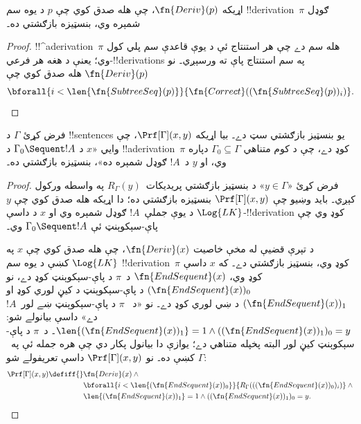 \documentclass[../../../include/open-logic-section]{subfiles}
\begin{document}
\begin{prop}
  اړيکه $\fn{Deriv}(p)$، چې هله صدق کوي چې $p$ د يوه سم
  !!{derivation}~$\pi$ ګوډل شمېره وي، بنسټيزه بازګشتي ده۔
\end{prop}

\begin{proof}
  !!^a{derivation}~$\pi$ هله سم دے چې هر استنتاج ئې د يوې قاعدې سم
  پلي کول وي؛ يعنې د هغه هر فرعي-!!{derivation}s په سم استنتاج پاې ته
  ورسېږي۔ نو $\fn{Deriv}(p)$ هله صدق کوي چې
  \[
  \bforall{i<\len{\fn{SubtreeSeq}(p)}}{\fn{Correct}((\fn{SubtreeSeq}(p))_i)}.
  \]
\end{proof}

\begin{prop}
فرض کړئ $\Gamma$ د !!{sentence}s يو بنسټيز بازګشتي سټ دے۔ بيا
اړيکه $\Prf[\Gamma](x,y)$، چې وايي «$x$ د
$\Gamma_0 \Sequent !A$ د !!a{derivation}~$\pi$ کوډ دے، چې د کوم
متناهي $\Gamma_0\subseteq\Gamma$ دپاره وي، او $y$ د~$!A$ ګوډل
شمېره ده»، بنسټيزه بازګشتي ده۔
\end{prop}

\begin{proof}
فرض کړئ «$y\in\Gamma$» د بنسټيز بازګشتي
پريديکات~$R_\Gamma(y)$ په واسطه ورکول کېږي۔ بايد وښيو چې
$\Prf[\Gamma](x,y)$ بنسټيزه بازګشتي ده؛ دا اړيکه هله صدق کوي چې
$y$ د يوې جملې~$!A$ ګوډل شمېره وي او $x$ د داسې
$\Log{LK}$-!!{derivation} کوډ وي چې پاې-سېکوېنټ ئې
$\Gamma_0\Sequent !A$ وي۔

د تېرې قضيې له مخې خاصيت $\fn{Deriv}(x)$، چې هله صدق کوي چې $x$ په
$\Log{LK}$ کښې د يوه سم !!{derivation}~$\pi$ کوډ وي، بنسټيز بازګشتي
دے۔ که $x$ داسې کوډ وي، $\fn{EndSequent}(x)$ د~$\pi$ د
پاې-سېکوېنټ کوډ دے، نو $(\fn{EndSequent}(x))_0$ د پاې-سېکوېنټ د
کيڼ لوري کوډ او $(\fn{EndSequent}(x))_1$ د ښي لوري کوډ دے۔ نو «د
~$\pi$ د پاې-سېکوېنټ ښے لور~$!A$ دے» داسې بيانولے شو:
$\len{(\fn{EndSequent}(x))_1}=1\land
((\fn{EndSequent}(x))_1)_0=y$۔
د~$\pi$ د پاې-سېکوېنټ کيڼ لور البته پخپله متناهي دے؛ يوازې دا بيانول
پکار دي چې هره جمله ئې په~$\Gamma$ کښې ده۔ نو
$\Prf[\Gamma](x,y)$ داسې تعريفولے شو:
\begin{align*}
\Prf[\Gamma](x, y) \defiff {}&
\fn{Deriv}(x) \land {} \\
& \bforall{i <
  \len{(\fn{EndSequent}(x))_0}}{R_\Gamma(((\fn{EndSequent}(x))_0)_i)} \land {}\\
& \len{(\fn{EndSequent}(x))_1} = 1 \land ((\fn{EndSequent}(x))_1)_0 = y.
\end{align*}
\end{proof}
\end{document}

